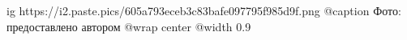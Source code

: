  
 
 
 
 

\ifcmt
  ig https://i2.paste.pics/605a793eceb3c83bafe097795f985d9f.png
	@caption Фото: предоставлено автором
  @wrap center
  @width 0.9
\fi
